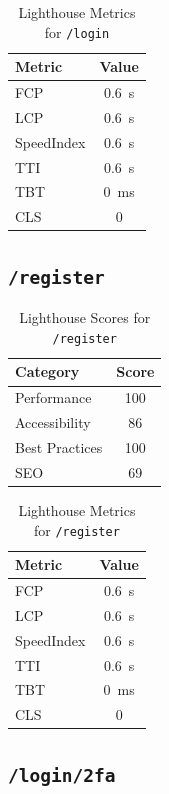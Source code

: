 \begin{table}[H]
  \centering
  \caption{Lighthouse Metrics for \texttt{/login}}
  \begin{tabular}{|l|c|}
    \hline
    Metric & Value \\ \hline
    FCP & 0.6 s \\ \hline
    LCP & 0.6 s \\ \hline
    SpeedIndex & 0.6 s \\ \hline
    TTI & 0.6 s \\ \hline
    TBT & 0 ms \\ \hline
    CLS & 0 \\ \hline
  \end{tabular}
\end{table}
\subsection{\texttt{/register}}

\begin{table}[H]
  \centering
  \caption{Lighthouse Scores for \texttt{/register}}
  \begin{tabular}{|l|c|}
    \hline
    Category & Score \\ \hline
    Performance & 100 \\ \hline
    Accessibility & 86 \\ \hline
    Best Practices & 100 \\ \hline
    SEO & 69 \\ \hline
  \end{tabular}
\end{table}

\begin{table}[H]
  \centering
  \caption{Lighthouse Metrics for \texttt{/register}}
  \begin{tabular}{|l|c|}
    \hline
    Metric & Value \\ \hline
    FCP & 0.6 s \\ \hline
    LCP & 0.6 s \\ \hline
    SpeedIndex & 0.6 s \\ \hline
    TTI & 0.6 s \\ \hline
    TBT & 0 ms \\ \hline
    CLS & 0 \\ \hline
  \end{tabular}
\end{table}
\subsection{\texttt{/login/2fa}}


